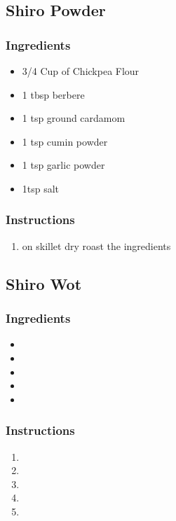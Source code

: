 \documentclass[11pt]{article}
\begin{document}
\subsection{Shiro Powder}
\label{sec:org7c8b907}
\subsubsection*{Ingredients}
\label{sec:orgee95189}
\begin{itemize}
\item 3/4 Cup of Chickpea Flour
\item 1 tbsp berbere
\item 1 tsp ground cardamom
\item 1 tsp cumin powder
\item 1 tsp garlic powder
\item 1tsp salt
\end{itemize}
\subsubsection*{Instructions}
\label{sec:org3994b94}
\begin{enumerate}
\item on skillet dry roast the ingredients
\end{enumerate}
\subsection{Shiro Wot}
\label{sec:org12b1f2b}
\subsubsection*{Ingredients}
\label{sec:orgf9761aa}
\begin{itemize}
\item 

\item 

\item 

\item 

\item 
\end{itemize}
\subsubsection*{Instructions}
\label{sec:org61795f2}
\begin{enumerate}
\item 

\item 

\item 

\item 

\item 
\end{enumerate}
\end{document}
